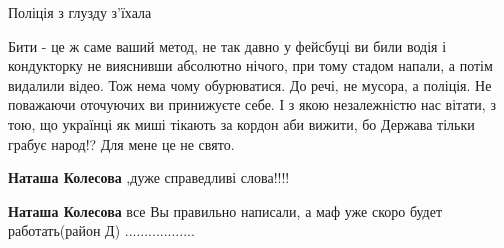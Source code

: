 \begin{itemize}
Поліція з глузду з'їхала

 

Бити - це ж саме ваший метод, не так давно у фейсбуці ви били водія і
кондукторку не вияснивши абсолютно нічого, при тому стадом напали, а потім
видалили відео. Тож нема чому обурюватися. До речі, не мусора, а поліція. Не
поважаючи оточуючих ви принижуєте себе. І з якою незалежністю нас вітати, з
тою, що українці як миші тікають за кордон аби вижити, бо Держава тільки грабує
народ!? Для мене це не свято.

\begin{itemize}
 
\textbf{Наташа Колесова} ,дуже справедливі слова!!!!

 
\textbf{Наташа Колесова} все Вы правильно написали, а маф уже скоро будет работать(район Д) ..................
\end{itemize}


\end{itemize}

